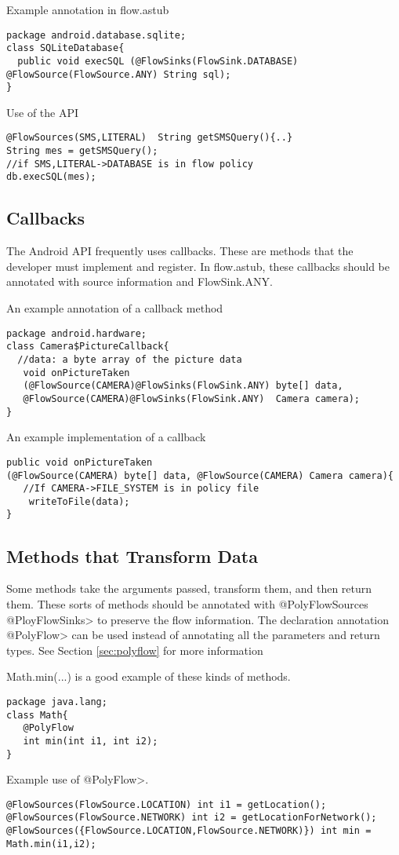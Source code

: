 Example annotation in flow.astub
\begin{Verbatim}
package android.database.sqlite;
class SQLiteDatabase{
  public void execSQL (@FlowSinks(FlowSink.DATABASE) @FlowSource(FlowSource.ANY) String sql);
}
\end{Verbatim}
Use of the API
\begin{Verbatim}
@FlowSources(SMS,LITERAL)  String getSMSQuery(){..}
String mes = getSMSQuery();
//if SMS,LITERAL->DATABASE is in flow policy
db.execSQL(mes);
\end{Verbatim}

\subsection{Callbacks}
The Android API frequently uses callbacks.  These are methods that the developer must 
implement and register. In flow.astub, these callbacks should be annotated
with source information and FlowSink.ANY.  

An example annotation of a callback method
\begin{Verbatim}
package android.hardware;
class Camera$PictureCallback{
  //data: a byte array of the picture data
   void onPictureTaken 
   (@FlowSource(CAMERA)@FlowSinks(FlowSink.ANY) byte[] data, 
   @FlowSource(CAMERA)@FlowSinks(FlowSink.ANY)  Camera camera);
}
\end{Verbatim}

An example implementation of a callback
\begin{Verbatim}
public void onPictureTaken
(@FlowSource(CAMERA) byte[] data, @FlowSource(CAMERA) Camera camera){
   //If CAMERA->FILE_SYSTEM is in policy file
    writeToFile(data);
}
\end{Verbatim}


\subsection{Methods that Transform Data}

Some methods take the arguments passed, transform them, and then return them.  These sorts of 
methods should be annotated with \<@PolyFlowSources @PloyFlowSinks>
  to preserve the flow information.  The declaration annotation \<@PolyFlow> can be used instead of
  annotating all the parameters and return types. See Section \ref{sec:polyflow} for more information 
  
  Math.min(...) is a good example of these kinds of methods. 
  
  \begin{Verbatim}
package java.lang;
class Math{
   @PolyFlow  
   int min(int i1, int i2);
}
\end{Verbatim}

Example use of \<@PolyFlow>.
\begin{Verbatim}
@FlowSources(FlowSource.LOCATION) int i1 = getLocation();
@FlowSources(FlowSource.NETWORK) int i2 = getLocationForNetwork();
@FlowSources({FlowSource.LOCATION,FlowSource.NETWORK)}) int min = Math.min(i1,i2);
 \end{Verbatim}



